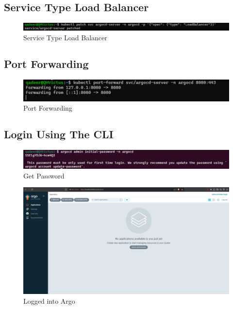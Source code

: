 \documentclass[conference]{IEEEtran}
\begin{document}
\subsection{Service Type Load Balancer}
\begin{figure}[htbp]
    \centering
    \includegraphics[width=1\linewidth]{Service Type Load Balancer.png}
    \caption{Service Type Load Balancer}
    \label{fig:service-type-load-balancer}
\end{figure}

\subsection{Port Forwarding}
\begin{figure}[htbp]
    \centering
    \includegraphics[width=1\linewidth]{Port Forwarding.png}
    \caption{Port Forwarding}
    \label{fig:port-forwarding}
\end{figure}

\subsection{Login Using The CLI}
\begin{figure}[htbp]
    \centering
    \includegraphics[width=1\linewidth]{Get Password.png}
    \caption{Get Password}
    \label{fig:get-password}
\end{figure}

\begin{figure}[htbp]
    \centering
    \includegraphics[width=1\linewidth]{Logged into Argo.png}
    \caption{Logged into Argo}
    \label{fig:logged-in}
\end{figure}
\end{document}
